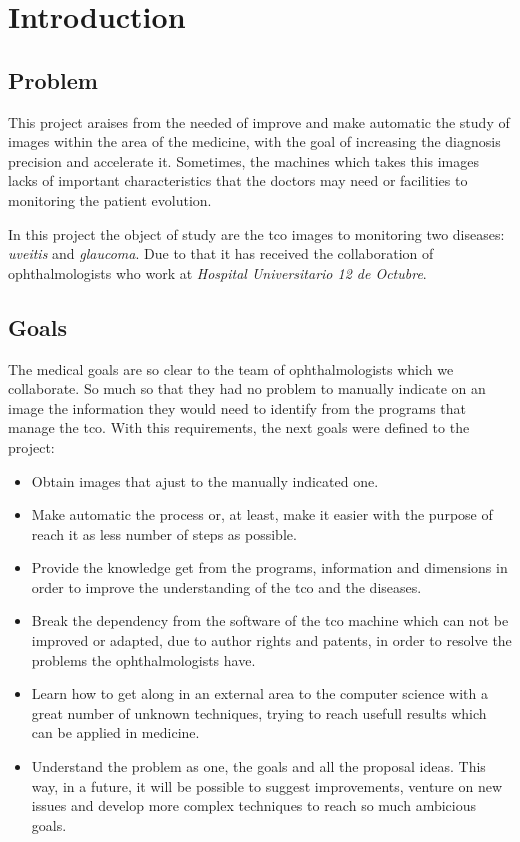 \chapter{Introduction}
\section{Problem}
This project araises from the needed of improve and make automatic the
study of images within the area of the medicine, with the goal of 
increasing the diagnosis precision and accelerate it. Sometimes, the
machines which takes this images lacks of important characteristics 
that the doctors may need or facilities to monitoring the patient evolution.

In this project the object of study are the \gls{tco} images to monitoring
two diseases: \emph{\gls{uveitis}} and \emph{\gls{glaucoma}}. Due to that
it has received the collaboration of ophthalmologists who work at
\emph{Hospital Universitario 12 de Octubre}.

\section{Goals}
The medical goals are so clear to the team of ophthalmologists which
we collaborate. So much so that they had no problem to manually indicate on an 
image the information they would need to identify from the programs that 
manage the \gls{tco}. With this requirements, the next goals were defined 
to the project:
\begin{itemize}
\item Obtain images that ajust to the manually indicated one.
\item Make automatic the process or, at least, make it easier with
the purpose of reach it as less number of steps as possible.
\item Provide the knowledge get from the programs, information and 
dimensions in order to improve the understanding of the \gls{tco} and
the diseases.
\item Break the dependency from the software of the \gls{tco} machine
which can not be improved or adapted, due to author rights and patents, 
in order to resolve the problems the ophthalmologists have.
\item Learn how to get along in an external area to the computer science
with a great number of unknown techniques, trying to reach usefull 
results which can be applied in medicine.
\item Understand the problem as one, the goals and all the proposal ideas.
This way, in a future, it will be possible to suggest improvements, venture
on new issues and develop more complex techniques to reach so much 
ambicious goals.
\end{itemize}

